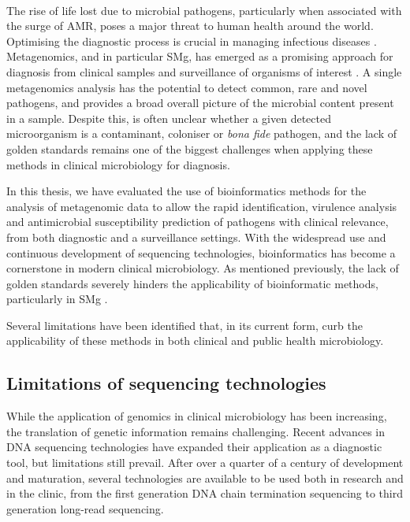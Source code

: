 \mbox{}\\
\vspace{8cm}

The rise of life lost due to microbial pathogens, particularly when associated with the surge of \ac{AMR}, poses a major threat to human health around the world. Optimising the diagnostic process is crucial in managing infectious diseases \citep{vos_global_2020}. Metagenomics, and in particular \ac{SMg}, has emerged as a promising approach for diagnosis from clinical samples and surveillance of organisms of interest \citep{loman_culture-independent_2013, rossen__2018, schuele_future_2021, chiu_clinical_2019}. A single metagenomics analysis has the potential to detect common, rare and novel pathogens, and provides a broad overall picture of the microbial content present in a sample. Despite this, is often unclear whether a given detected microorganism is a contaminant, coloniser or \textit{bona fide} pathogen, and the lack of golden standards remains one of the biggest challenges when applying these methods in clinical microbiology for diagnosis.

In this thesis, we have evaluated the use of bioinformatics methods for the analysis of metagenomic data to allow the rapid identification, virulence analysis and antimicrobial susceptibility prediction of pathogens with clinical relevance, from both diagnostic and a surveillance settings. With the widespread use and continuous development of sequencing technologies, bioinformatics has become a cornerstone in modern clinical microbiology. As mentioned previously, the lack of golden standards severely hinders the applicability of bioinformatic methods, particularly in \ac{SMg} \citep{carrico_primer_2018, couto_critical_2018, angers-loustau_challenges_2018, gruening_recommendations_2019, sczyrba_critical_2017}. 

Several limitations have been identified that, in its current form, curb the applicability of these methods in both clinical and public health microbiology. 

\subsection{Limitations of sequencing technologies}

While the application of genomics in clinical microbiology has been increasing, the translation of genetic information remains challenging. Recent advances in DNA sequencing technologies have expanded their application as a diagnostic tool, but limitations still prevail. After over a quarter of a century of development and maturation, several technologies are available to be used both in research and in the clinic, from the first generation DNA chain termination sequencing to third generation long-read sequencing. 


